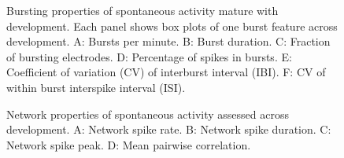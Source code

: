 \documentclass{article}
\begin{document}
\begin{figure}
  \centering
  \caption{Bursting properties of spontaneous activity mature with
    development.  Each panel shows box plots of one burst feature
    across development. A: Bursts
    per minute. B: Burst duration. C: Fraction of bursting electrodes. D: Percentage of spikes in
    bursts.  E: Coefficient of variation (CV) of interburst interval
    (IBI).  F: CV of within burst interspike interval (ISI).}
\end{figure}

\begin{figure}
  \centering
  \caption{Network properties of spontaneous activity assessed
    across development.  A: Network spike rate.  B: Network spike
    duration.  C: Network spike peak. D: Mean pairwise correlation.}
\end{figure}
\end{document}
